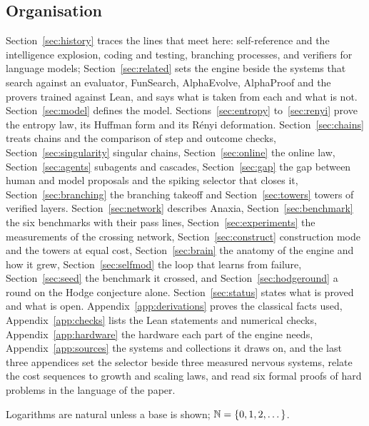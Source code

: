 \subsection{Organisation}

Section~\ref{sec:history} traces the lines that meet here: self-reference and the intelligence explosion, coding and testing, branching processes, and verifiers for language models; Section~\ref{sec:related} sets the engine beside the systems that search against an evaluator, FunSearch, AlphaEvolve, AlphaProof and the provers trained against Lean, and says what is taken from each and what is not. Section~\ref{sec:model} defines the model. Sections~\ref{sec:entropy} to~\ref{sec:renyi} prove the entropy law, its Huffman form and its R\'enyi deformation. Section~\ref{sec:chains} treats chains and the comparison of step and outcome checks, Section~\ref{sec:singularity} singular chains, Section~\ref{sec:online} the online law, Section~\ref{sec:agents} subagents and cascades, Section~\ref{sec:gap} the gap between human and model proposals and the spiking selector that closes it, Section~\ref{sec:branching} the branching takeoff and Section~\ref{sec:towers} towers of verified layers. Section~\ref{sec:network} describes Anaxia, Section~\ref{sec:benchmark} the six benchmarks with their pass lines, Section~\ref{sec:experiments} the measurements of the crossing network, Section~\ref{sec:construct} construction mode and the towers at equal cost, Section~\ref{sec:brain} the anatomy of the engine and how it grew, Section~\ref{sec:selfmod} the loop that learns from failure, Section~\ref{sec:seed} the benchmark it crossed, and Section~\ref{sec:hodgeround} a round on the Hodge conjecture alone. Section~\ref{sec:status} states what is proved and what is open. Appendix~\ref{app:derivations} proves the classical facts used, Appendix~\ref{app:checks} lists the Lean statements and numerical checks, Appendix~\ref{app:hardware} the hardware each part of the engine needs, Appendix~\ref{app:sources} the systems and collections it draws on, and the last three appendices set the selector beside three measured nervous systems, relate the cost sequences to growth and scaling laws, and read six formal proofs of hard problems in the language of the paper.

Logarithms are natural unless a base is shown; $\mathbb{N}=\{0,1,2,\dots\}$.
